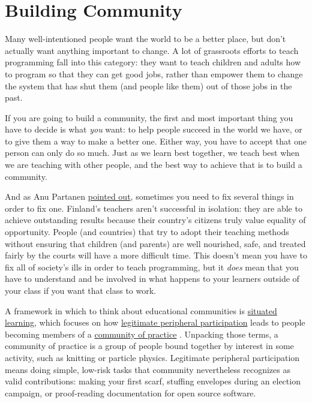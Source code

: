 \chapter{Building Community}\label{s:community}

Many well-intentioned people want the world to be a better place, but
don't actually want anything important to change. A lot of grassroots
efforts to teach programming fall into this category: they want to teach
children and adults how to program so that they can get good jobs,
rather than empower them to change the system that has shut them (and
people like them) out of those jobs in the past.

If you are going to build a community, the first and most important
thing you have to decide is what \emph{you} want: to help people succeed in
the world we have, or to give them a way to make a better one. Either
way, you have to accept that one person can only do so much. Just as we
learn best together, we teach best when we are teaching with other
people, and the best way to achieve that is to build a community.

And as Anu Partanen \href{https://www.theatlantic.com/national/archive/2011/12/what-americans-keep-ignoring-about-finlands-school-success/250564/}{pointed out}, sometimes
you need to fix several things in order to fix one. Finland's teachers
aren't successful in isolation: they are able to achieve outstanding
results because their country's citizens truly value equality of
opportunity. People (and countries) that try to adopt their teaching
methods without ensuring that children (and parents) are well
nourished, safe, and treated fairly by the courts will have a more
difficult time. This doesn't mean you have to fix all of society's
ills in order to teach programming, but it \emph{does} mean that you have
to understand and be involved in what happens to your learners outside
of your class if you want that class to work.

A framework in which to think about educational communities is
\protect\hyperlink{g:situated-learning}{situated learning}, which focuses on how
\protect\hyperlink{g:legitimate-peripheral-participation}{legitimate peripheral
participation} leads to people
becoming members of a \protect\hyperlink{g:community-of-practice}{community of
practice} \cite{Weng2015}. Unpacking
those terms, a community of practice is a group of people bound
together by interest in some activity, such as knitting or particle
physics. Legitimate peripheral participation means doing simple,
low-risk tasks that community nevertheless recognizes as valid
contributions: making your first scarf, stuffing envelopes during an
election campaign, or proof-reading documentation for open source
software.

